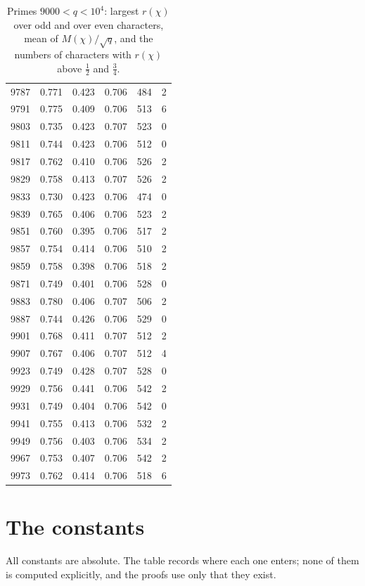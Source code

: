 \documentclass[11pt,a4paper,reqno]{amsart}
\theoremstyle{remark}
\numberwithin{equation}{section}
\begin{document}
\begin{table}[p]
\begin{tabular}{@{}rccccr@{}}
9787 & 0.771 & 0.423 & 0.706 & 484 & 2\\
9791 & 0.775 & 0.409 & 0.706 & 513 & 6\\
9803 & 0.735 & 0.423 & 0.707 & 523 & 0\\
9811 & 0.744 & 0.423 & 0.706 & 512 & 0\\
9817 & 0.762 & 0.410 & 0.706 & 526 & 2\\
9829 & 0.758 & 0.413 & 0.707 & 526 & 2\\
9833 & 0.730 & 0.423 & 0.706 & 474 & 0\\
9839 & 0.765 & 0.406 & 0.706 & 523 & 2\\
9851 & 0.760 & 0.395 & 0.706 & 517 & 2\\
9857 & 0.754 & 0.414 & 0.706 & 510 & 2\\
9859 & 0.758 & 0.398 & 0.706 & 518 & 2\\
9871 & 0.749 & 0.401 & 0.706 & 528 & 0\\
9883 & 0.780 & 0.406 & 0.707 & 506 & 2\\
9887 & 0.744 & 0.426 & 0.706 & 529 & 0\\
9901 & 0.768 & 0.411 & 0.707 & 512 & 2\\
9907 & 0.767 & 0.406 & 0.707 & 512 & 4\\
9923 & 0.749 & 0.428 & 0.707 & 528 & 0\\
9929 & 0.756 & 0.441 & 0.706 & 542 & 2\\
9931 & 0.749 & 0.404 & 0.706 & 542 & 0\\
9941 & 0.755 & 0.413 & 0.706 & 532 & 2\\
9949 & 0.756 & 0.403 & 0.706 & 534 & 2\\
9967 & 0.753 & 0.407 & 0.706 & 542 & 2\\
9973 & 0.762 & 0.414 & 0.706 & 518 & 6\\
\bottomrule
\end{tabular}
\caption{Primes $9000<q<10^4$: largest $r(\chi)$ over odd and over even characters, mean of $M(\chi)/\sqrt q$, and the numbers of characters with $r(\chi)$ above $\tfrac12$ and $\tfrac34$.}
\label{tab:big}
\end{table}

\section{The constants}\label{app:const}
All constants are absolute. The table records where each one enters; none of them is computed explicitly, and the proofs use only that they exist.
\end{document}
